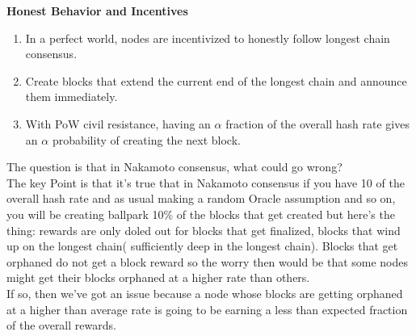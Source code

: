 \textbf{Honest Behavior and Incentives}
\begin{enumerate}
  \item In a perfect world, nodes are incentivized to honestly follow longest chain consensus.
  \item Create blocks that extend the current end of the longest chain and announce them immediately.
  \item With PoW civil resistance, having an $\alpha$ fraction of the overall hash rate gives an $\alpha$ probability of creating the next block.
\end{enumerate}

The question is that in Nakamoto consensus, what could go wrong?\\
The key Point is that it's true that in Nakamoto consensus if you have 10 of the overall hash rate and as usual making a random Oracle 
assumption and so on, you will be creating ballpark 10\% of the blocks that get created but here's the thing: rewards are only doled out 
for blocks that get finalized, blocks that wind up on the longest chain( sufficiently deep in the longest chain). Blocks that get 
orphaned do not get a block reward so the worry then would be that some nodes might get their blocks orphaned at a higher rate than others.\\
If so, then we've got an issue because a node whose blocks are getting orphaned at a higher than average rate is going to be earning a 
less than expected fraction of the overall rewards.\\

